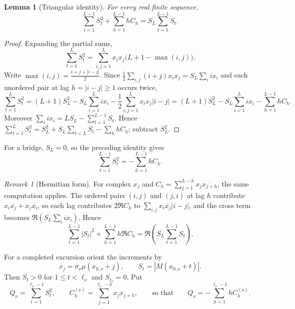 \documentclass[11pt,reqno]{amsart}
\numberwithin{equation}{section}
\theoremstyle{plain}
\newtheorem{lemma}[theorem]{Lemma}
\theoremstyle{definition}
\theoremstyle{remark}
\newtheorem{remark}[theorem]{Remark}
\begin{document}
\begin{lemma}[Triangular identity]
\label{lem:triangular-corr}
For every real finite sequence,
\begin{equation}
\label{eq:general-triangular}
\sum_{t=1}^{L-1}S_t^2+\sum_{h=1}^{L-1}hC_h
=S_L\sum_{t=1}^{L-1}S_t.
\end{equation}
\end{lemma}

\begin{proof}
Expanding the partial sums,
\begin{equation}
\sum_{t=1}^{L}S_t^2
=\sum_{i,j=1}^{L}x_ix_j\bigl(L+1-\max(i,j)\bigr).
\end{equation}
Write $\max(i,j)=\frac{i+j+|i-j|}{2}$. Since
$\frac12\sum_{i,j}(i+j)x_ix_j=S_L\sum_i ix_i$ and each unordered pair at
lag $h=|i-j|\ge1$ occurs twice,
\begin{equation}
\sum_{t=1}^{L}S_t^2=(L+1)S_L^2-S_L\sum_{i=1}^{L}ix_i
-\frac12\sum_{i,j=1}^{L}x_ix_j|i-j|
=(L+1)S_L^2-S_L\sum_{i=1}^{L}ix_i-\sum_{h=1}^{L-1}hC_h .
\end{equation}
Moreover $\sum_i ix_i=LS_L-\sum_{t=1}^{L-1}S_t$.
Hence
$\sum_{t=1}^{L}S_t^2=S_L^2+S_L\sum_{t<L}S_t-\sum_hhC_h$; subtract $S_L^2$.
\end{proof}

For a bridge, $S_L=0$, so the preceding identity gives
\begin{equation}
\label{eq:bridge-triangular}
\sum_{t=1}^{L-1}S_t^2=-\sum_{h=1}^{L-1}hC_h.
\end{equation}

\begin{remark}[Hermitian form]
\label{rem:hermitian}
For complex $x_j$ and $C_h=\sum_{j=1}^{L-h}x_j\overline{x_{j+h}}$, the same
computation applies. The ordered pairs $(i,j)$ and $(j,i)$ at lag $h$
contribute $x_i\overline{x_j}+x_j\overline{x_i}$, so each lag contributes
$2\Re C_h$ to $\sum_{i,j}x_i\overline{x_j}|i-j|$, and the cross term
becomes $\Re(\overline{S_L}\sum_i ix_i)$. Hence
\begin{equation}
\sum_{t=1}^{L-1}|S_t|^2+\sum_{h=1}^{L-1}h\Re C_h
=\Re\!\left(\overline{S_L}\sum_{t=1}^{L-1}S_t\right).
\end{equation}
\end{remark}

For a completed excursion orient the increments by
\begin{equation}
\label{eq:orientation}
x_j=\sigma_\nu\mu(x_{0,\nu}+j),\qquad
S_t=|M(x_{0,\nu}+t)|.
\end{equation}
Then $S_t>0$ for $1\le t<\ell_\nu$ and $S_{\ell_\nu}=0$. Put
\begin{equation}
\label{eq:Q_def}
Q_\nu=\sum_{t=1}^{\ell_\nu-1}S_t^2,\qquad
C_h^{(\nu)}=\sum_{j=1}^{\ell_\nu-h}x_jx_{j+h},
\qquad\text{so that}\qquad
Q_\nu=-\sum_{h=1}^{\ell_\nu-1}hC_h^{(\nu)}.
\end{equation}
\end{document}
